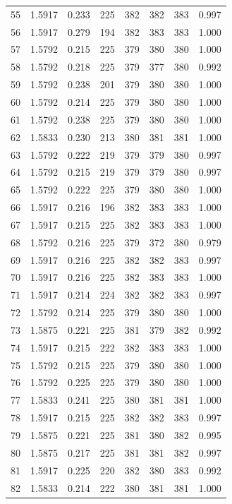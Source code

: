 \documentclass[10pt]{article}
\begin{document}
\begin{longtable}{rrrrrrrr}
55 & 1.5917 & 0.233 & 225 & 382 & 382 & 383 & 0.997\\
56 & 1.5917 & 0.279 & 194 & 382 & 383 & 383 & 1.000\\
57 & 1.5792 & 0.215 & 225 & 379 & 380 & 380 & 1.000\\
58 & 1.5792 & 0.218 & 225 & 379 & 377 & 380 & 0.992\\
59 & 1.5792 & 0.238 & 201 & 379 & 380 & 380 & 1.000\\
60 & 1.5792 & 0.214 & 225 & 379 & 380 & 380 & 1.000\\
61 & 1.5792 & 0.238 & 225 & 379 & 380 & 380 & 1.000\\
62 & 1.5833 & 0.230 & 213 & 380 & 381 & 381 & 1.000\\
63 & 1.5792 & 0.222 & 219 & 379 & 379 & 380 & 0.997\\
64 & 1.5792 & 0.215 & 219 & 379 & 379 & 380 & 0.997\\
65 & 1.5792 & 0.222 & 225 & 379 & 380 & 380 & 1.000\\
66 & 1.5917 & 0.216 & 196 & 382 & 383 & 383 & 1.000\\
67 & 1.5917 & 0.215 & 225 & 382 & 383 & 383 & 1.000\\
68 & 1.5792 & 0.216 & 225 & 379 & 372 & 380 & 0.979\\
69 & 1.5917 & 0.216 & 225 & 382 & 382 & 383 & 0.997\\
70 & 1.5917 & 0.216 & 225 & 382 & 383 & 383 & 1.000\\
71 & 1.5917 & 0.214 & 224 & 382 & 382 & 383 & 0.997\\
72 & 1.5792 & 0.214 & 225 & 379 & 380 & 380 & 1.000\\
73 & 1.5875 & 0.221 & 225 & 381 & 379 & 382 & 0.992\\
74 & 1.5917 & 0.215 & 222 & 382 & 383 & 383 & 1.000\\
75 & 1.5792 & 0.215 & 225 & 379 & 380 & 380 & 1.000\\
76 & 1.5792 & 0.225 & 225 & 379 & 380 & 380 & 1.000\\
77 & 1.5833 & 0.241 & 225 & 380 & 381 & 381 & 1.000\\
78 & 1.5917 & 0.215 & 225 & 382 & 382 & 383 & 0.997\\
79 & 1.5875 & 0.221 & 225 & 381 & 380 & 382 & 0.995\\
80 & 1.5875 & 0.217 & 225 & 381 & 381 & 382 & 0.997\\
81 & 1.5917 & 0.225 & 220 & 382 & 380 & 383 & 0.992\\
82 & 1.5833 & 0.214 & 222 & 380 & 381 & 381 & 1.000\\

\end{longtable}
\end{document}
